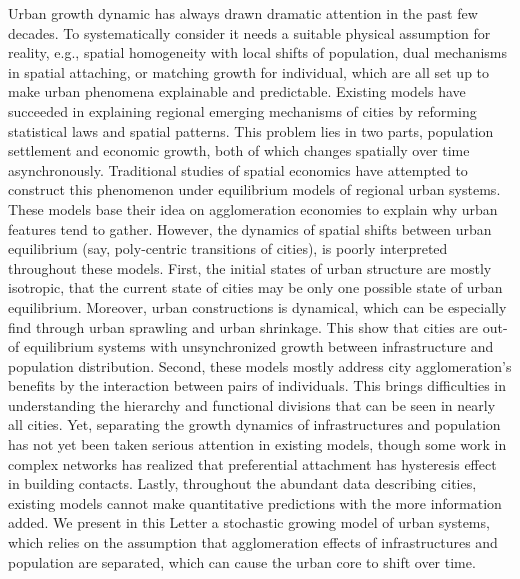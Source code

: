 \documentclass[reprint,unsortedaddress,amsmath,amssymb,aps,prl,fixfloat,showkeys]{revtex4-2}
\begin{document}
Urban growth dynamic has always drawn dramatic attention in the past few decades. To systematically consider it needs a suitable physical assumption for reality, e.g., spatial homogeneity with local shifts of population\cite{PhysRevLett.79.523}, dual mechanisms in spatial attaching\cite{PhysRevX.4.011008}, or matching growth for individual\cite{Li2017Simple}, which are all set up to make urban phenomena explainable and predictable. Existing models have succeeded in explaining regional emerging mechanisms of cities\cite{PhysRevLett.79.523} by reforming statistical laws and spatial patterns\cite{gabaix1999zipf's,clark1951urban}. This problem lies in two parts, population settlement and economic growth, both of which changes spatially over time asynchronously. Traditional studies of spatial economics have attempted to construct this phenomenon under equilibrium models of regional urban systems\cite{batty1992form}. These models base their idea on agglomeration economies to explain why urban features tend to gather. However, the dynamics of spatial shifts between urban equilibrium (say, poly-centric transitions of cities), is poorly interpreted throughout these models. First, the initial states of urban structure are mostly isotropic, that the current state of cities may be only one possible state of urban equilibrium. Moreover, urban constructions is dynamical, which can be especially find through urban sprawling and urban shrinkage. This show that cities are out-of equilibrium systems with unsynchronized growth between infrastructure and population distribution. Second, these models mostly address city agglomeration's benefits by the interaction between pairs of individuals. This brings difficulties in understanding the hierarchy and functional divisions that can be seen in nearly all cities\cite{bassolas2019hierarchical}. Yet, separating the growth dynamics of infrastructures and population has not yet been taken serious attention in existing models, though some work in complex networks has realized that preferential attachment has hysteresis effect in building contacts. Lastly, throughout the abundant data describing cities, existing models cannot make quantitative predictions with the more information added. We present in this Letter a stochastic growing model of urban systems, which relies on the assumption that agglomeration effects of infrastructures and population are separated, which can cause the urban core to shift over time. 
\end{document}
